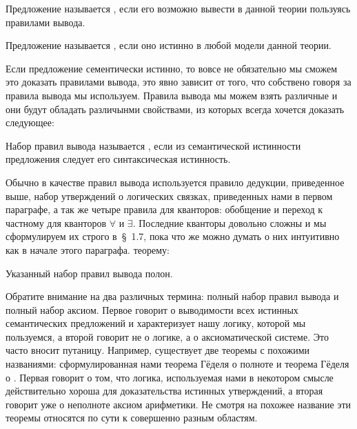 \begin{definition}
Предложение называется , если его возможно вывести в данной теории пользуясь правилами вывода.
\end{definition}

\begin{definition}
Предложение называется , если оно истинно в любой модели данной теории.
\end{definition}

Если предложение сементически истинно, то вовсе не обязательно мы сможем это доказать правилами вывода, это явно зависит от того, что собствено говоря за правила вывода мы используем. Правила вывода мы можем взять различные и они будут обладать различынми свойствами, из которых всегда хочется доказать следующее:

\begin{definition}
Набор правил вывода называется , если из семантической истинности предложения следует его синтаксическая истинность.
\end{definition}

Обычно в качестве правил вывода используется правило дедукции, приведенное выше, набор утверждений о логических связках, приведенных нами в первом параграфе, а так же четыре правила для кванторов: обобщение и переход к частному для кванторов $\forall$ и $\exists$. Последние кванторы довольно сложны и мы сформулируем их строго в~\S~1.7, пока что же можно думать о них интуитивно как в начале этого параграфа. теорему:

\begin{GodelsCompleteness}
Указанный набор правил вывода полон.
\end{GodelsCompleteness}

Обратите внимание на два различных термина: полный набор правил вывода и полный набор аксиом. Первое говорит о выводимости всех истинных семантических предложений  и характеризует нашу логику, которой мы пользуемся, а второй говорит не о логике, а о аксиоматической системе. Это часто вносит путаницу. Например, существует две теоремы с похожими названиями: сформулированная нами теорема Гёделя о полноте и теорема Гёделя о . Первая говорит о том, что логика, используемая нами в некотором смысле действительно хороша для доказательства истинных утверждений, а вторая говорит уже о неполноте аксиом арифметики. Не смотря на похожее название эти теоремы относятся по сути к совершенно разным областям.

